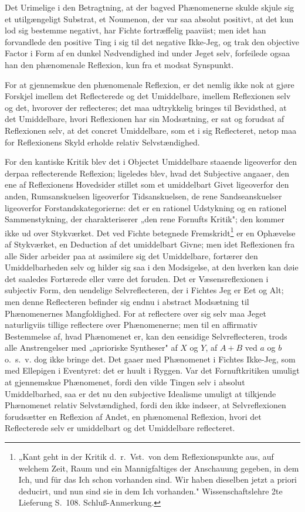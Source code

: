 \documentclass[12pt]{book}
\newcommand{\opage}[1]{\marginnote{\footnotesize\textit{[#1]}}}
\begin{document}
Det Urimelige i den Betragtning, at der bagved Phænomenerne skulde skjule sig et
utilgængeligt Substrat, et Noumenon, der var saa absolut positivt, at det kun lod
sig bestemme negativt, har Fichte fortræffelig paaviist; men idet han forvandlede
den positive Ting i sig til det negative Ikke-Jeg, og trak den objective Factor i
Form af en dunkel Nødvendighed ind under Jeget selv, forfeilede ogsaa han den
phænomenale Reflexion, kun fra et modsat Synspunkt.

For at gjennemskue den phænomenale Reflexion, er det nemlig ikke nok at gjøre
Forskjel imellem det Reflecterede og det Umiddelbare, imellem Reflexionen selv og
det, hvorover der reflecteres; det maa udtrykkelig bringes til Bevidsthed, at det
Umiddelbare, hvori Reflexionen har sin Modsætning, er sat og forudsat af Reflexionen
selv, at det concret Umiddelbare, som et i sig Reflecteret, netop maa for
Reflexionens Skyld erholde relativ Selvstændighed.

For den kantiske Kritik blev det i Objectet Umiddelbare staaende ligeoverfor den
derpaa reflecterende Reflexion; ligeledes blev, hvad det Subjective angaaer, den ene
af Reflexionens Hovedsider stillet som et umiddelbart Givet ligeoverfor den anden,
Rumsanskuelsen ligeoverfor Tidsanskuelsen, de rene Sandseanskuelser ligeoverfor
Forstandskategorierne: det er en rationel Udstykning og en rationel Sammenstykning,
der charakteriserer „den rene Fornufts Kritik"; den kommer ikke ud over Stykværket.
Det ved Fichte betegnede Fremskridt\footnote{„Kant geht in der Kritik d.\ r.\ Vst.\
von dem Reflexionspunkte aus, auf welchem Zeit, Raum und ein Mannigfaltiges der
Anschauung gegeben, in dem Ich, und für das Ich schon vorhanden sind. Wir haben
dieselben jetzt a priori deducirt, und nun sind sie in dem Ich vorhanden."
Wissenschaftslehre 2te Lieferung S.~108. Schluß-Anmerkung.} er
\opage{81} en Ophævelse af Stykværket, en Deduction af det umiddelbart Givne; men idet
Reflexionen fra alle Sider arbeider paa at assimilere sig det Umiddelbare, fortærer
den Umiddelbarheden selv og hilder sig saa i den Modsigelse, at den hverken kan døie
det saaledes Fortærede eller være det foruden. Det er Væsensreflexionen i subjectiv
Form, den uendelige Selvreflecteren, der i Fichtes Jeg er Eet og Alt; men denne
Reflecteren befinder sig endnu i abstract Modsætning til Phænomenernes
Mangfoldighed. For at reflectere over sig selv maa Jeget naturligviis tillige
reflectere over Phænomenerne; men til en affirmativ Bestemmelse af, hvad Phænomenet
er, kan den eensidige Selvreflecteren, trods alle Anstrengelser med „aprioriske
Syntheser" af $X$ og $Y$, af $A + B$ ved $a$ og $b$ o.\ s.\ v. dog ikke bringe det.
Det gaaer med Phænomenet i Fichtes Ikke-Jeg, som med Ellepigen i Eventyret: det er
huult i Ryggen. Var det Fornuftkritiken umuligt at gjennemskue Phænomenet, fordi den
vilde Tingen selv i absolut Umiddelbarhed, saa er det nu den subjective Idealisme
umuligt at tilkjende Phænomenet relativ Selvstændighed, fordi den ikke indseer, at
Selvreflexionen forudsætter en Reflexion af Andet, en phænomenal Reflexion, hvori det
Reflecterede selv er umiddelbart og det Umiddelbare reflecteret.
\end{document}
